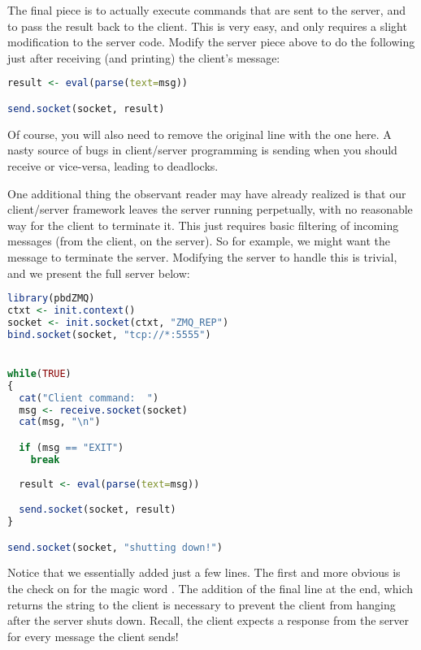The final piece is to actually execute commands that are sent to the server,
and to pass the result back to the client.  This is very easy, and only 
requires a slight modification to the server code.  Modify the server piece
above to do the following just after receiving (and printing) the client's
message:

\begin{lstlisting}[language=R,title=Server Modification]
result <- eval(parse(text=msg))

send.socket(socket, result)
\end{lstlisting}

Of course, you will also need to remove the original  line
with the one here.  A nasty source of bugs in client/server programming is
sending when you should receive or vice-versa, leading to deadlocks.

One additional thing the observant reader may have already realized is that our
client/server framework leaves the server running perpetually, with no
reasonable way for the client to terminate it.  This just requires basic
filtering of incoming messages (from the client, on the server).  So for
example, we might want the message  to terminate the server.
Modifying the server to handle this is trivial, and we present the full server
below:

\begin{lstlisting}[language=R,title=Full Server]
library(pbdZMQ)
ctxt <- init.context()
socket <- init.socket(ctxt, "ZMQ_REP")
bind.socket(socket, "tcp://*:5555")


while(TRUE)
{
  cat("Client command:  ")
  msg <- receive.socket(socket)
  cat(msg, "\n")

  if (msg == "EXIT")
    break
  
  result <- eval(parse(text=msg))

  send.socket(socket, result)
}

send.socket(socket, "shutting down!")
\end{lstlisting}

Notice that we essentially added just a few lines.  The first and more obvious
is the check on  for the magic word .  The addition
of the final  line at the end, which returns the string
 to the client is necessary to prevent the client from
hanging after the server shuts down.  Recall, the client expects a response
from the server for every message the client sends!



